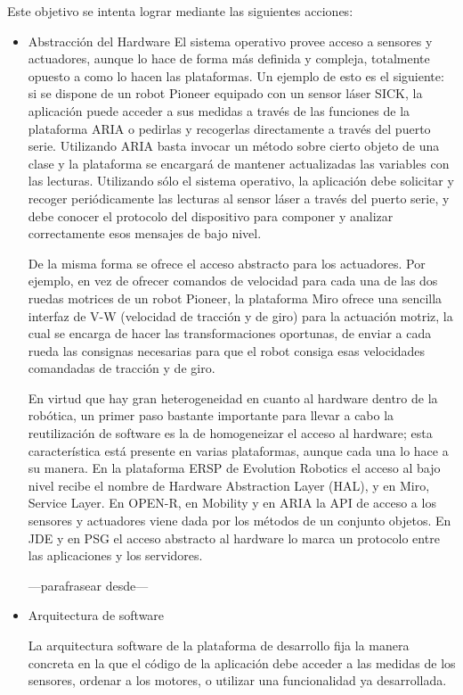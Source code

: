 Este objetivo se intenta lograr mediante las siguientes acciones:

\begin{itemize}
	\itemsep1pt \parskip1pt 
	\item Abstracción del Hardware
	El sistema operativo provee acceso a sensores y actuadores, aunque lo hace de forma más definida y compleja, totalmente opuesto a como lo hacen las plataformas. Un ejemplo de esto es el siguiente: si se dispone de un robot Pioneer equipado con un sensor láser SICK, la aplicación puede acceder a sus medidas a través de las funciones de la plataforma ARIA o pedirlas y recogerlas directamente a través del puerto serie. Utilizando ARIA basta invocar un método sobre cierto objeto de una clase y la plataforma se encargará de mantener actualizadas las variables con las lecturas. Utilizando sólo el sistema operativo, la aplicación debe solicitar y recoger periódicamente las lecturas al sensor láser a través del puerto serie, y debe conocer el protocolo del dispositivo para componer y analizar correctamente esos mensajes de bajo nivel.

	De la misma forma se ofrece el acceso abstracto para los actuadores. Por ejemplo, en vez de ofrecer comandos de velocidad para cada una de las dos ruedas motrices de un robot Pioneer, la plataforma Miro ofrece una sencilla interfaz de V-W (velocidad de tracción y de giro) para la actuación motriz, la cual se encarga de hacer las transformaciones oportunas, de enviar a cada rueda las consignas necesarias para que el robot consiga esas velocidades comandadas de tracción y de giro.

	En virtud que hay gran heterogeneidad en cuanto al hardware dentro de la robótica, un primer paso bastante importante para llevar a cabo la reutilización de software es la de homogeneizar el acceso al hardware; esta característica está presente en varias plataformas, aunque cada una lo hace a su manera. En la plataforma ERSP de Evolution Robotics el acceso al bajo nivel recibe el nombre de Hardware Abstraction Layer (HAL), y en Miro, Service Layer. En OPEN-R, en Mobility y en ARIA la API de acceso a los sensores y actuadores viene dada por los métodos de un conjunto objetos. En JDE y en PSG el acceso abstracto al hardware lo marca un protocolo entre las aplicaciones y los servidores.

---parafrasear desde---
	\item Arquitectura de software

	La arquitectura software de la plataforma de desarrollo fija la manera concreta en la que el código de la aplicación debe acceder a las medidas de los sensores, ordenar a los motores, o utilizar una funcionalidad ya desarrollada.


\end{itemize}
